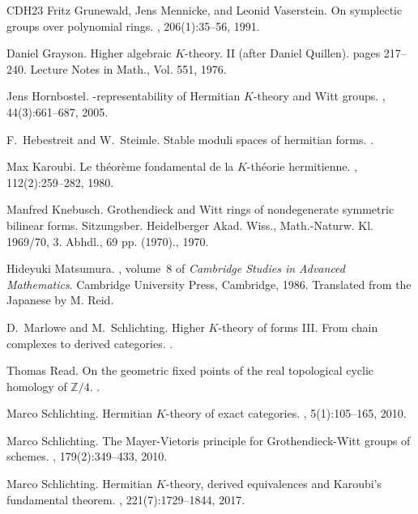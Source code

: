 \documentclass[10pt,twoside,a4paper,reqno]{amsart}
\theoremstyle{definition}
\numberwithin{equation}{section}
\renewcommand{\|}{\operatorname{|}}
\begin{document}
\begin{thebibliography}{CDH{\etalchar{+}}23}
Fritz Grunewald, Jens Mennicke, and Leonid Vaserstein.
\newblock On symplectic groups over polynomial rings.
, 206(1):35--56, 1991.

Daniel Grayson.
\newblock Higher algebraic {$K$}-theory. {II} (after {D}aniel {Q}uillen).
\newblock pages 217--240. Lecture Notes in Math., Vol. 551, 1976.

Jens Hornbostel.
-representability of {H}ermitian {$K$}-theory and {W}itt
  groups.
, 44(3):661--687, 2005.

F.~Hebestreit and W.~Steimle.
\newblock Stable moduli spaces of hermitian forms.
.

Max Karoubi.
\newblock Le th\'{e}or\`eme fondamental de la {$K$}-th\'{e}orie hermitienne.
, 112(2):259--282, 1980.

Manfred Knebusch.
\newblock Grothendieck and {Witt} rings of nondegenerate symmetric bilinear
  forms.
\newblock Sitzungsber. {Heidelberger} {Akad}. {Wiss}., {Math}.-{Naturw}. {Kl}.
  1969/70, 3. {Abhdl}., 69 pp. (1970)., 1970.

Hideyuki Matsumura.
, volume~8 of {\em Cambridge Studies in
  Advanced Mathematics}.
\newblock Cambridge University Press, Cambridge, 1986.
\newblock Translated from the Japanese by M. Reid.

D.~Marlowe and M.~Schlichting.
\newblock Higher {$K$}-theory of forms {III}. {F}rom chain complexes to derived
  categories.
.

Thomas Read.
\newblock On the geometric fixed points of the real topological cyclic homology
  of $\mathbb{Z}/4$.
.

Marco Schlichting.
\newblock Hermitian {$K$}-theory of exact categories.
, 5(1):105--165, 2010.

Marco Schlichting.
\newblock The {M}ayer-{V}ietoris principle for {G}rothendieck-{W}itt groups of
  schemes.
, 179(2):349--433, 2010.

Marco Schlichting.
\newblock Hermitian {$K$}-theory, derived equivalences and {K}aroubi's
  fundamental theorem.
, 221(7):1729--1844, 2017.


\end{thebibliography}
\end{document}
